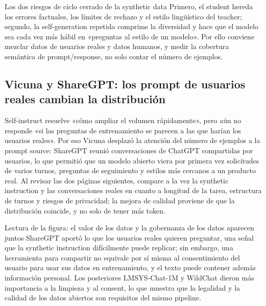 \begin{warningbox}{Los dos riesgos de ciclo cerrado de la synthetic data}
Primero, el student hereda los errores factuales, los límites de rechazo y el estilo lingüístico del teacher; segundo, la self-generation repetida comprime la diversidad y hace que el modelo sea cada vez más hábil en «preguntas al estilo de un modelo». Por ello conviene mezclar datos de usuarios reales y datos humanos, y medir la cobertura semántica de prompt/response, no solo contar el número de ejemplos.
\end{warningbox}


\subsection{Vicuna y ShareGPT: los prompt de usuarios reales cambian la distribución}

Self-instruct resuelve «cómo ampliar el volumen rápidamente», pero aún no responde «si las preguntas de entrenamiento se parecen a las que harían los usuarios reales». Por eso Vicuna desplazó la atención del número de ejemplos a la prompt source: ShareGPT reunió conversaciones de ChatGPT compartidas por usuarios, lo que permitió que un modelo abierto viera por primera vez solicitudes de varios turnos, preguntas de seguimiento y estilos más cercanos a un producto real. Al revisar las dos páginas siguientes, compare a la vez la synthetic instruction y las conversaciones reales en cuanto a longitud de la tarea, estructura de turnos y riesgos de privacidad; la mejora de calidad proviene de que la distribución coincide, y no solo de tener más token.



\begin{knowledgebox}{Lectura de la figura: el valor de los datos y la gobernanza de los datos aparecen juntos}
ShareGPT aportó lo que los usuarios reales quieren preguntar, una señal que la synthetic instruction difícilmente puede replicar; sin embargo, una herramienta para compartir no equivale por sí misma al consentimiento del usuario para usar sus datos en entrenamiento, y el texto puede contener además información personal. Los posteriores LMSYS-Chat-1M y WildChat dieron más importancia a la limpieza y al consent, lo que muestra que la legalidad y la calidad de los datos abiertos son requisitos del mismo pipeline.
\end{knowledgebox}

